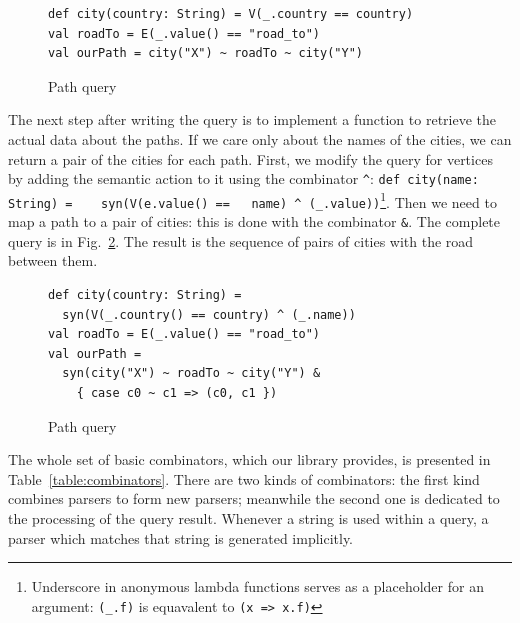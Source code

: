 \begin{figure}[h]
\begin{lstlisting}
def city(country: String) = V(_.country == country)
val roadTo = E(_.value() == "road_to")
val ourPath = city("X") ~ roadTo ~ city("Y")
\end{lstlisting}
\caption{Path query}
\label{fig:simpleQuery}
\end{figure}

The next step after writing the query is to implement a function to retrieve the actual data about the paths.
If we care only about the names of the cities, we can return a pair of the cities for each path.
First, we modify the query for vertices by adding the semantic action to it using the combinator \lstinline{^}: \lstinline{def city(name: String) =    syn(V(e.value() ==   name) ^ (_.value))}\footnote{Underscore in anonymous lambda functions serves as a placeholder for an argument: \lstinline{(_.f)} is equavalent to \lstinline{(x => x.f)} }.
Then we need to map a path to a pair of cities: this is done with the combinator \lstinline{&}.
The complete query is in Fig.~\ref{fig:simpleQueryV2}.
The result is the sequence of pairs of cities with the road between them.

\begin{figure}[h]
\begin{lstlisting}
def city(country: String) =
  syn(V(_.country() == country) ^ (_.name))
val roadTo = E(_.value() == "road_to")
val ourPath =
  syn(city("X") ~ roadTo ~ city("Y") &
    { case c0 ~ c1 => (c0, c1 })
\end{lstlisting}
\caption{Path query}
\label{fig:simpleQueryV2}
\end{figure}


The whole set of basic combinators, which our library provides, is presented in Table~\ref{table:combinators}.
There are two kinds of combinators: the first kind combines parsers to form new parsers; meanwhile the second one is dedicated to the processing of the query result.
Whenever a string is used within a query, a parser which matches that string is generated implicitly.

